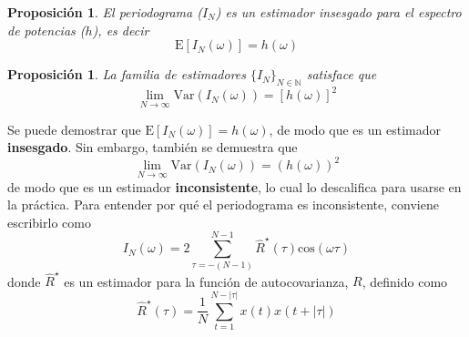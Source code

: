 \documentclass[12pt,letterpaper,draft]{book}
\newtheorem{proposicion}[teorema]{Proposición}
\newcommand{\N}{\mathbb{N}}
\newcommand{\COS}[1]{\mathrm{cos}\left( #1 \right)}
\newcommand{\E}[1]{\mathrm{E}\left[ #1 \right]}
\newcommand{\Var}[1]{\mathrm{Var}\left( #1 \right)}
\newcommand{\abso}[1]{\left| #1 \right|}
\begin{document}
\begin{proposicion}
El periodograma ($I_N$) es un estimador insesgado para el espectro de potencias ($h$), es decir
\begin{equation}
\E{I_N(\omega)} = h(\omega)
\end{equation}
\end{proposicion}

\begin{proposicion}
La familia de estimadores $\{I_N\}_{N\in\N}$ satisface que
\begin{equation}
\lim_{N\rightarrow \infty} \Var{I_N(\omega)} = \left[ h(\omega) \right]^{2}
\end{equation}
\end{proposicion}


Se puede demostrar que $\E{I_N(\omega)} = h(\omega)$, de modo que es un estimador 
\textbf{insesgado}. Sin embargo, también se demuestra que
\begin{equation*}
\lim_{N\rightarrow \infty} \Var{I_N(\omega)} = \left( h(\omega) \right)^{2}
\end{equation*}
de modo que es un estimador \textbf{inconsistente}, lo cual lo descalifica para usarse en la 
práctica.
%
Para entender por qué el periodograma es inconsistente, conviene escribirlo como
\begin{equation}
I_N(\omega) = 2 \sum_{\tau = -(N-1)}^{N-1} \widehat{R}^{\star}(\tau) \COS{\omega \tau}
\label{txt_periodograma2}
\end{equation}
%
donde $\widehat{R}^{\star}$ es un estimador para la función de autocovarianza, $R$, definido como
\begin{equation}
\widehat{R}^{\star} (\tau) = \frac{1}{N} \sum_{t = 1}^{N-\abso{\tau}} x(t) x(t+\abso{\tau})
\end{equation}
\end{document}
